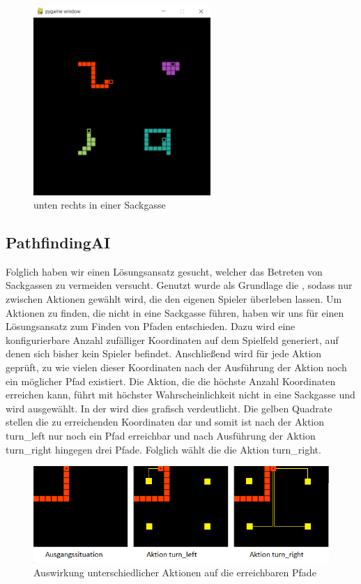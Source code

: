 \begin{figure}[htb]
    \centering
    \includegraphics[width=0.6\textwidth]{Bilder/Sackgassen_Problem.png}
    \caption{ unten rechts in einer Sackgasse}
    \label{fig:Sackgassen-Problem}
\end{figure}

\subsection{PathfindingAI}
\label{subsec:pathfinding-ai}

Folglich haben wir einen Lösungsansatz gesucht, welcher das Betreten von Sackgassen zu vermeiden versucht.
Genutzt wurde als Grundlage die , sodass nur zwischen Aktionen gewählt wird, die den eigenen
Spieler überleben lassen.
Um Aktionen zu finden, die nicht in eine Sackgasse führen, haben wir uns für einen Lösungsansatz zum Finden von
Pfaden entschieden.
Dazu wird eine konfigurierbare Anzahl zufälliger Koordinaten auf dem Spielfeld generiert, auf denen sich bisher kein
Spieler befindet.
Anschließend wird für jede Aktion geprüft, zu wie vielen dieser Koordinaten nach der Ausführung der Aktion noch ein
möglicher Pfad existiert.
Die Aktion, die die höchste Anzahl Koordinaten erreichen kann, führt mit höchster Wahrscheinlichkeit
nicht in eine Sackgasse und wird ausgewählt.
In der  wird dies grafisch verdeutlicht.
Die gelben Quadrate stellen die zu erreichenden Koordinaten dar und somit ist nach der Aktion turn\_left nur noch ein
Pfad erreichbar und nach Ausführung der Aktion turn\_right hingegen drei Pfade.
Folglich wählt die  die Aktion turn\_right.

\begin{figure}[htb]
    \centering
    \includegraphics{Bilder/pathfinding_example.png}
    \caption{Auswirkung unterschiedlicher Aktionen auf die erreichbaren Pfade}
    \label{fig:sackgasse-pfade}
\end{figure}

